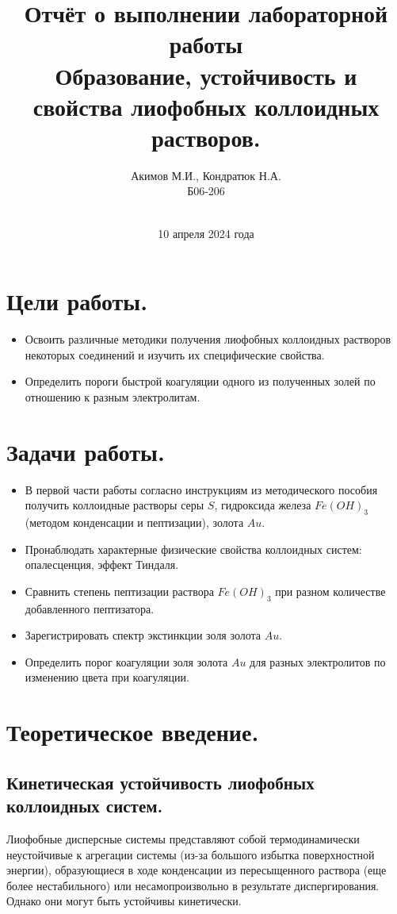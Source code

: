 \documentclass[a4paper, 11pt]{article}%
\author{Акимов М.И., Кондратюк Н.А. \\ Б06-206}
\title{Отчёт о выполнении лабораторной работы  \\ \textbf{Образование, устойчивость и свойства лиофобных коллоидных растворов.}}
\date{\\10 апреля 2024 года}
\begin{document}
\maketitle
\section{Цели работы.}
    \begin{itemize}
    \item Освоить различные методики получения лиофобных коллоидных растворов некоторых соединений и изучить их специфические свойства.
    \item Определить пороги быстрой коагуляции одного из полученных золей по отношению к разным электролитам.
    \end{itemize}
\section{Задачи работы.}
    \begin{itemize}
    \item В первой части работы согласно инструкциям из методического пособия получить коллоидные растворы серы $S$, гидроксида железа $Fe(OH)_3$ (методом конденсации и пептизации), золота $Au$.
    \item Пронаблюдать характерные физические свойства коллоидных систем: опалесценция, эффект Тиндаля.
    \item Сравнить степень пептизации раствора $Fe(OH)_3$ при разном количестве добавленного пептизатора.
    \item Зарегистрировать спектр экстинкции золя золота $Au$.
    \item Определить порог коагуляции золя золота $Au$ для разных электролитов по изменению цвета при коагуляции.
    \end{itemize}
\section{Теоретическое введение.}
\subsection{Кинетическая устойчивость лиофобных коллоидных систем.} \;

\par Лиофобные дисперсные
системы представляют собой термодинамически неустойчивые к агрегации
системы (из-за большого избытка поверхностной энергии), образующиеся в ходе конденсации из пересыщенного раствора (еще более
нестабильного) или несамопроизвольно в результате диспергирования. Однако они могут
быть устойчивы кинетически.  
\end{document}
